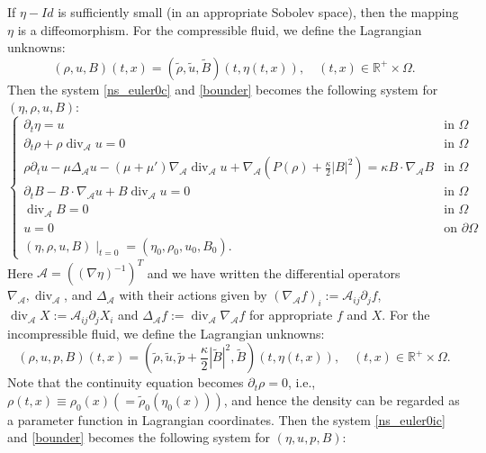 \documentclass[a4paper,reqno,11pt]{amsart}
\numberwithin{equation}{section}
\begin{document}
If $\eta-Id $ is sufficiently small (in an appropriate Sobolev space), then the mapping $\eta$ is a diffeomorphism. For the compressible fluid, we define the Lagrangian unknowns:
\begin{equation}
(\rho,u,B)(t,x)=(\tilde \rho,\tilde u,\tilde B)(t,\eta(t,x)),\quad (t,x)\in \mathbb{R}^+\times\Omega.
\end{equation}
Then the system \eqref{ns_euler0c} and \eqref{bounder} becomes the following system for $(\eta,\rho,u,B)$:
\begin{equation}\label{lagrangianc}
\begin{cases}
\partial_t \eta = u  &
 \text{in }
\Omega
\\
\partial_t \rho +{\rho}\operatorname{div}_{\mathcal{A}}    u =0 & \text{in }
\Omega
 \\ \rho  \partial_t    u   -\mu\Delta_{\mathcal{A}} u-(\mu+\mu')\nabla_{\mathcal{A}} \operatorname{div}_{\mathcal{A}} u +\nabla_{\mathcal{A}}   \left(P(\rho)+\frac{\kappa}{2}| {B}|^2 \right)  =\kappa {B} \cdot \nabla_{\mathcal{A}}  {B}    & \text{in }
\Omega
 \\ \partial_t B-B\cdot\nabla_{\mathcal{A}} u+B \operatorname{div}_{\mathcal{A}} u=0& \text{in }
\Omega
\\  {\operatorname{div}_{\mathcal{A}}} B=0& \text{in }
\Omega  \\
 {u}=0 &\text{on }{\partial}\Omega
\\ (\eta,\rho,  u,   B)\mid_{t=0}=( \eta_0,\rho_0, u_0,    B_0).
\end{cases}
\end{equation}
Here ${\mathcal{A}}=((\nabla\eta)^{-1})^T$ and we have written the differential operators $\nabla_{\mathcal{A}}, \operatorname{div}_{\mathcal{A}}$, and $\Delta_{\mathcal{A}}$ with their actions given by
$({{\nabla}_{\mathcal{A}}} f)_i := {\mathcal{A}}_{ij} {\partial}_j f$, ${\operatorname{div}_{\mathcal{A}}} X := {\mathcal{A}}_{ij}{\partial}_j X_i $ and ${\Delta_{\mathcal{A}}} f := {\operatorname{div}_{\mathcal{A}}} {{\nabla}_{\mathcal{A}}} f$
for appropriate $f$ and $X$. For the incompressible fluid, we define the Lagrangian unknowns:
\begin{equation}
(\rho,u,p,B)(t,x)=(\tilde \rho,\tilde u,\tilde p+\frac{\kappa}{2}|\tilde{B}|^2,\tilde B)(t,\eta(t,x)),\quad (t,x)\in \mathbb{R}^+\times\Omega.
\end{equation}
Note that the continuity equation becomes ${\partial_t}\rho=0$, i.e., $\rho(t,x)\equiv   \rho_0(x)(=\tilde \rho_0(\eta_0(x)))$, and hence the density can be regarded as a parameter function in Lagrangian coordinates. Then the system \eqref{ns_euler0ic} and \eqref{bounder} becomes the following system for $(\eta,u,p,B)$:
\end{document}
